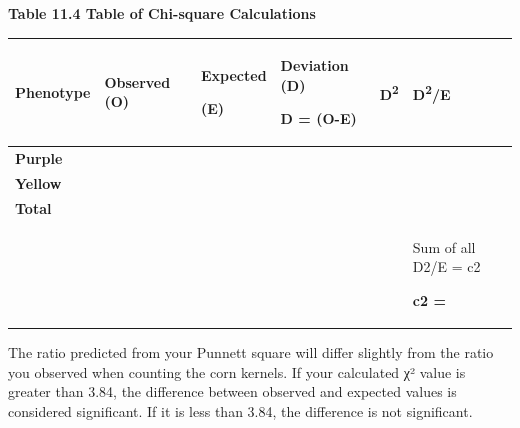 \documentclass[
  letterpaper,
  DIV=11,
  numbers=noendperiod]{scrreprt}
\newcounter{none} %
\begin{document}
\textbf{Table 11.4 Table of Chi-square Calculations}

{\def\LTcaptype{none} %
\begin{longtable}[]{@{}
  >{\raggedright\arraybackslash}p{}
  >{\raggedright\arraybackslash}p{}
  >{\raggedright\arraybackslash}p{}
  >{\raggedright\arraybackslash}p{}
  >{\raggedright\arraybackslash}p{}
  >{\raggedright\arraybackslash}p{}@{}}
\toprule\noalign{}
\begin{minipage}[b]{\linewidth}\raggedright
\textbf{Phenotype}
\end{minipage} & \begin{minipage}[b]{\linewidth}\raggedright
\textbf{Observed (O)}
\end{minipage} & \begin{minipage}[b]{\linewidth}\raggedright
\textbf{Expected}

\textbf{(E)}
\end{minipage} & \begin{minipage}[b]{\linewidth}\raggedright
\textbf{Deviation (D)}

\textbf{D = (O-E)}
\end{minipage} & \begin{minipage}[b]{\linewidth}\raggedright
\textbf{D\textsuperscript{2}}
\end{minipage} & \begin{minipage}[b]{\linewidth}\raggedright
\textbf{D\textsuperscript{2}/E}
\end{minipage} \\
\midrule\noalign{}
\endhead
\bottomrule\noalign{}
\endlastfoot
\textbf{Purple} & & & & & \\
\textbf{Yellow} & & & & & \\
\textbf{Total} & & & & & \\
& & & & & Sum of all D2/E = c2

\textbf{c2 =} \\
\end{longtable}
}

The ratio predicted from your Punnett square will differ slightly from
the ratio you observed when counting the corn kernels. If your
calculated χ² value is greater than 3.84, the difference between
observed and expected values is considered significant. If it is less
than 3.84, the difference is not significant.
\end{document}
